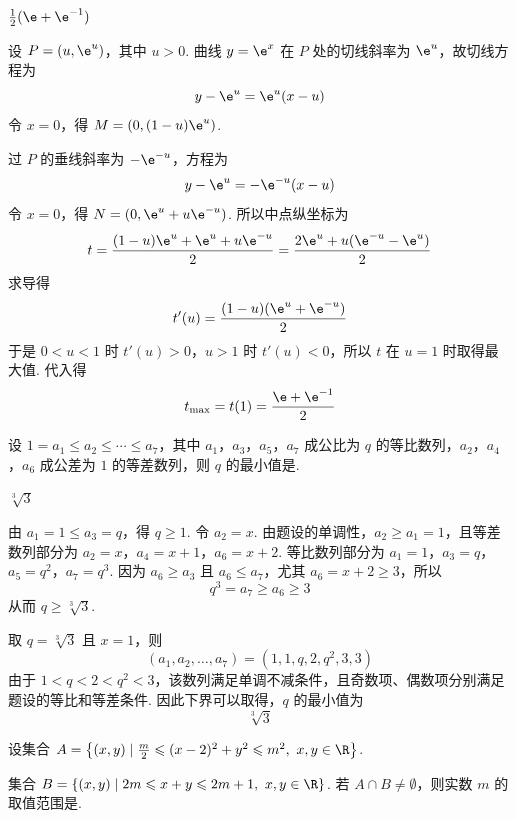 \begin{answer}
\(\frac{1}{2}(\e+\e^{-1})\)
\end{answer}

\begin{solution}
设 \(P=(u,\e^u)\)，其中 \(u>0\). 曲线 \(y=\e^x\) 在 \(P\) 处的切线斜率为 \(\e^u\)，故切线方程为
\[
y-\e^u=\e^u(x-u)
\]
令 \(x=0\)，得 \(M=(0,(1-u)\e^u)\).

过 \(P\) 的垂线斜率为 \(-\e^{-u}\)，方程为
\[
y-\e^u=-\e^{-u}(x-u)
\]
令 \(x=0\)，得 \(N=(0,\e^u+u\e^{-u})\). 所以中点纵坐标为
\[
t=\frac{(1-u)\e^u+\e^u+u\e^{-u}}{2}
=\frac{2\e^u+u(\e^{-u}-\e^u)}{2}
\]
求导得
\[
t'(u)=\frac{(1-u)(\e^u+\e^{-u})}{2}
\]
于是 \(0<u<1\) 时 \(t'(u)>0\)，\(u>1\) 时 \(t'(u)<0\)，所以 \(t\) 在 \(u=1\) 时取得最大值. 代入得
\[
t_{\max}=t(1)=\frac{\e+\e^{-1}}{2}
\]
\end{solution}

\begin{problem}
设 \(1=a_{1}\leqslant a_{2}\leqslant \cdots \leqslant a_{7}\)，其中 \(a_{1}\)，\(a_{3}\)，\(a_{5}\)，\(a_{7}\) 成公比为 \(q\) 的等比数列，\(a_{2}\)，\(a_{4}\)，\(a_{6}\) 成公差为 \(1\) 的等差数列，则 \(q\) 的最小值是\fillinblank{}.
\end{problem}

\begin{answer}
\(\sqrt[3]{3}\)
\end{answer}

\begin{solution}
由 \(a_1=1\leqslant a_3=q\)，得 \(q\geqslant1\). 令 \(a_2=x\). 由题设的单调性，\(a_2\geqslant a_1=1\)，且等差数列部分为
\(a_2=x\)，\(a_4=x+1\)，\(a_6=x+2\).
等比数列部分为
\(a_1=1\)，\(a_3=q\)，\(a_5=q^2\)，\(a_7=q^3\).
因为 \(a_6\geqslant a_3\) 且 \(a_6\leqslant a_7\)，尤其 \(a_6=x+2\geqslant3\)，所以
\[
q^3=a_7\geqslant a_6\geqslant3
\]
从而 \(q\geqslant\sqrt[3]{3}\).

取 \(q=\sqrt[3]{3}\) 且 \(x=1\)，则
\[
(a_1,a_2,\ldots,a_7)=(1,1,q,2,q^2,3,3)
\]
由于 \(1<q<2<q^2<3\)，该数列满足单调不减条件，且奇数项、偶数项分别满足题设的等比和等差条件. 因此下界可以取得，\(q\) 的最小值为
\[
\sqrt[3]{3}
\]
\end{solution}

\begin{problem}
设集合 \(A=\left\{(x,y)\mid \frac{m}{2}\leqslant (x-2)^2+y^2\leqslant m^2,\ x,y\in\R\right\}\).

集合 \(B=\left\{(x,y)\mid 2m\leqslant x+y\leqslant 2m+1,\ x,y\in\R\right\}\).
若 \(A\cap B\neq\emptyset\)，则实数 \(m\) 的取值范围是\fillinblank{}.
\end{problem}

